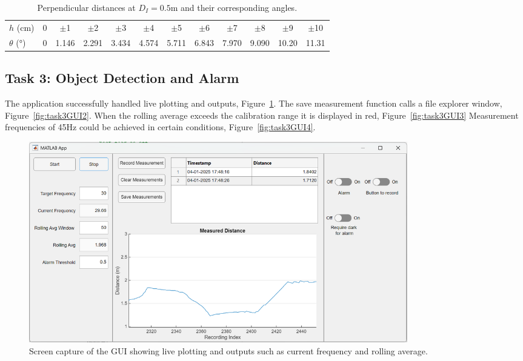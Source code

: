 \documentclass[a4paper,12pt]{article}
\begin{document}
\begin{table}[ht]
    \centering
    \begin{tabular}{lccccccccccc}
        \hline
        $h$ (cm) & 0 & $\pm$1 & $\pm$2 & $\pm$3 & $\pm$4 & $\pm$5 & $\pm$6 & $\pm$7 & $\pm$8 & $\pm$9 & $\pm$10\\
        $\theta$ (°) & 0 & 1.146 & 2.291 & 3.434 & 4.574 & 5.711 & 6.843 & 7.970 & 9.090 & 10.20 & 11.31 \\
        \hline
    \end{tabular}
    \caption{Perpendicular distances at $D_{I}=0.5$m and their corresponding angles.}
    \label{tab:angles}
\end{table}

\break

\subsection{Task 3: Object Detection and Alarm}
The application successfully handled live plotting and outputs, Figure~\ref{fig:task3GUI1}. The save measurement function calls a file explorer window, Figure~\ref{fig:task3GUI2}.
When the rolling average exceeds the calibration range it is displayed in red, Figure~\ref{fig:task3GUI3}
Measurement frequencies of 45Hz could be achieved in certain conditions, Figure~\ref{fig:task3GUI4}.

\begin{figure}[htbp]
    \centering
    \includegraphics[width=0.8\textwidth]{figs/task3GUI1.png}
    \caption{Screen capture of the GUI showing live plotting and outputs such as current frequency and rolling average.}
    \label{fig:task3GUI1}
\end{figure}
\end{document}
